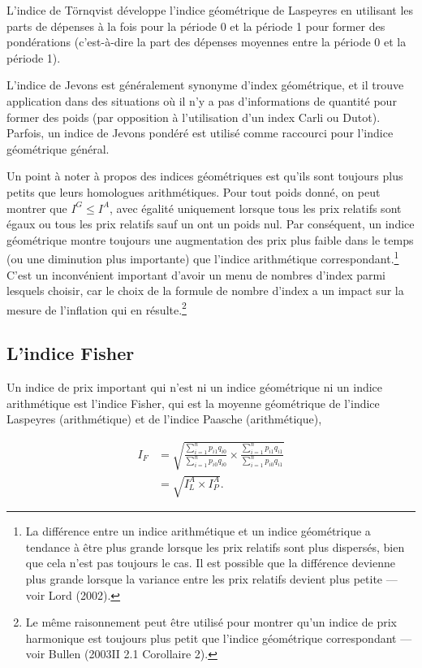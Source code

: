 \documentclass[
]{article}
\begin{document}
L'indice de Törnqvist développe l'indice géométrique de Laspeyres en utilisant les parts de dépenses à la fois pour la période 0 et la période 1 pour former des pondérations (c'est-à-dire la part des dépenses moyennes entre la période 0 et la période 1).

L'indice de Jevons est généralement synonyme d'index géométrique, et il trouve application dans des situations où il n'y a pas d'informations de quantité pour former des poids (par opposition à l'utilisation d'un index Carli ou Dutot). Parfois, un indice de Jevons pondéré est utilisé comme raccourci pour l'indice géométrique général.

Un point à noter à propos des indices géométriques est qu'ils sont toujours plus petits que leurs homologues arithmétiques. Pour tout poids donné, on peut montrer que \(I^{G} \leq I^{A}\), avec égalité uniquement lorsque tous les prix relatifs sont égaux ou tous les prix relatifs sauf un ont un poids nul. Par conséquent, un indice géométrique montre toujours une augmentation des prix plus faible dans le temps (ou une diminution plus importante) que l'indice arithmétique correspondant.\footnote{La différence entre un indice arithmétique et un indice géométrique a tendance à être plus grande lorsque les prix relatifs sont plus dispersés, bien que cela n'est pas toujours le cas. Il est possible que la différence devienne plus grande lorsque la variance entre les prix relatifs devient plus petite --- voir Lord (2002).} C'est un inconvénient important d'avoir un menu de nombres d'index parmi lesquels choisir, car le choix de la formule de nombre d'index a un impact sur la mesure de l'inflation qui en résulte.\footnote{Le même raisonnement peut être utilisé pour montrer qu'un indice de prix harmonique est toujours plus petit que l'indice géométrique correspondant --- voir Bullen (2003II 2.1 Corollaire 2).}

\hypertarget{lindice-fisher}{%
\subsection{L'indice Fisher}\label{lindice-fisher}}

Un indice de prix important qui n'est ni un indice géométrique ni un indice arithmétique est l'indice Fisher, qui est la moyenne géométrique de l'indice Laspeyres (arithmétique) et de l'indice Paasche (arithmétique),

\begin{align*}
I_{F} &= \sqrt{\frac{\sum_{i = 1}^{n} p_{i1} q_{i0}}{\sum_{i = 1}^{n} p_{i0} q_{i0}} \times \frac{\sum_{i = 1}^{n} p_{i1} q_{i1}}{\sum_{i = 1}^{n} p_{i0} q_{i1}}} \\
&= \sqrt{I^{A}_{L} \times I^{A}_{P}}.
\end{align*}
\end{document}
